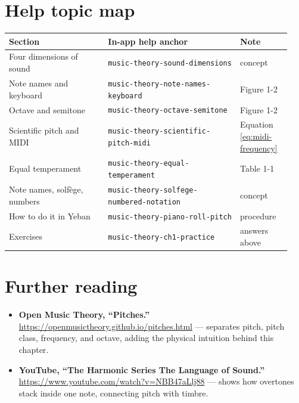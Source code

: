 \section{Help topic map}

\begin{center}
\small
\setlength{\tabcolsep}{3pt}
\begin{longtable}{p{0.33\linewidth}p{0.44\linewidth}p{0.17\linewidth}}
\toprule
Section & In-app help anchor & Note \\
\midrule
\endhead
Four dimensions of sound & \texttt{music-theory-sound-dimensions} & concept \\
Note names and keyboard & \texttt{music-theory-note-names-keyboard} & Figure 1-2 \\
Octave and semitone & \texttt{music-theory-octave-semitone} & Figure 1-2 \\
Scientific pitch and MIDI & \texttt{music-theory-scientific-pitch-midi} & Equation \eqref{eq:midi-frequency} \\
Equal temperament & \texttt{music-theory-equal-temperament} & Table 1-1 \\
Note names, solfège, numbers & \texttt{music-theory-solfege-numbered-notation} & concept \\
How to do it in Yeban & \texttt{music-theory-piano-roll-pitch} & procedure \\
Exercises & \texttt{music-theory-ch1-practice} & answers above \\
\bottomrule
\end{longtable}
\end{center}

\section*{Further reading}
\begin{itemize}
  \item \textbf{Open Music Theory, “Pitches.”} \url{https://openmusictheory.github.io/pitches.html} — separates pitch, pitch class, frequency, and octave, adding the physical intuition behind this chapter.
  \item \textbf{YouTube, “The Harmonic Series \textbar{} The Language of Sound.”} \url{https://www.youtube.com/watch?v=NBB47aLlj88} — shows how overtones stack inside one note, connecting pitch with timbre.
\end{itemize}

